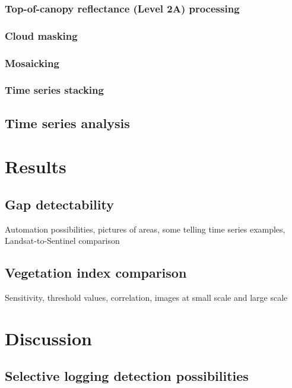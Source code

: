 \documentclass[a4paper,12pt]{scrbook}
\begin{document}
\subsection{Top-of-canopy reflectance (Level 2A) processing}

\subsection{Cloud masking}

\subsection{Mosaicking}

\subsection{Time series stacking}

\section{Time series analysis}

\chapter{Results}

\section{Gap detectability}

Automation possibilities, pictures of areas, some telling time series examples, Landsat-to-Sentinel comparison

\section{Vegetation index comparison}

Sensitivity, threshold values, correlation, images at small scale and large scale

\chapter{Discussion}

\section{Selective logging detection possibilities}
\end{document}
